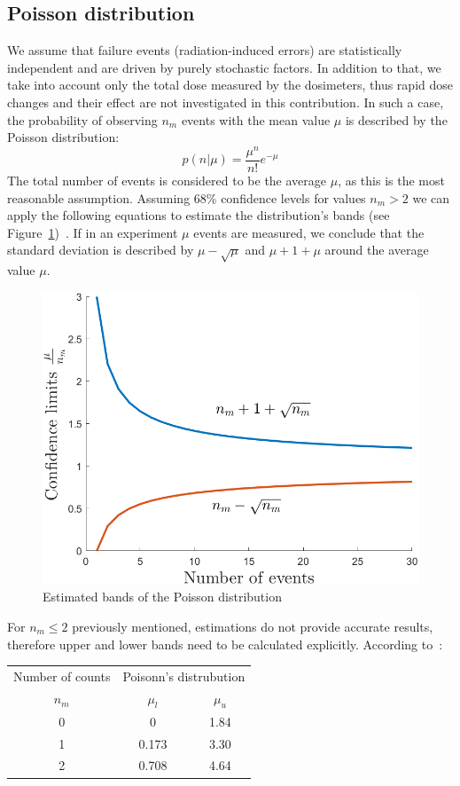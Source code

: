 \subsection{Poisson distribution}
We assume that failure events (radiation-induced errors) are statistically independent and are driven by purely stochastic factors. In addition to that, we take into account only the total dose measured by the dosimeters, thus rapid dose changes and their effect are not investigated in this contribution. In such a case, the probability of observing $n_{m}$ events with the mean value $\mu$ is described by the Poisson distribution:\newline
\begin{equation}
    p(n|\mu) = \frac{\mu^{n}}{n!}e^{-\mu}
\end{equation}
The total number of events is considered to be the average $\mu$, as this is the most reasonable assumption.
Assuming 68\% confidence levels for values $n_{m} > 2$ we can apply the following equations to estimate the distribution's bands (see Figure~\ref{fig:poisson})~\cite{schmidt}.
If in an experiment $\mu$ events are measured, we conclude that the standard deviation is described by $\mu - \sqrt{\mu}$ and $\mu + 1 + \mu$ around the average value $\mu$.
\begin{figure}[!h]
    \centering
    \includegraphics[width=0.55\columnwidth]{Chapter4/images/poisson.png}
    \caption{Estimated bands of the Poisson distribution~\cite{schmidt}}
    \label{fig:poisson}
\end{figure}
For $n_{m} \leq 2$ previously mentioned, estimations do not provide accurate results, therefore upper and lower bands need to be calculated explicitly. According to~\cite{schmidt}:



\begin{table}[!h]
\centering
\begin{tabular}{ccc}
\hline
Number of counts & \multicolumn{2}{c}{Poisonn's distrubution} \\ \cline{2-3} 
$n_{m}$          & $\mu_{l}$            & $\mu_{u}$           \\ \hline
0                & 0                    & 1.84                \\
1                & 0.173                & 3.30                \\
2                & 0.708                & 4.64                \\ \hline
\end{tabular}

\end{table}
\newpage
